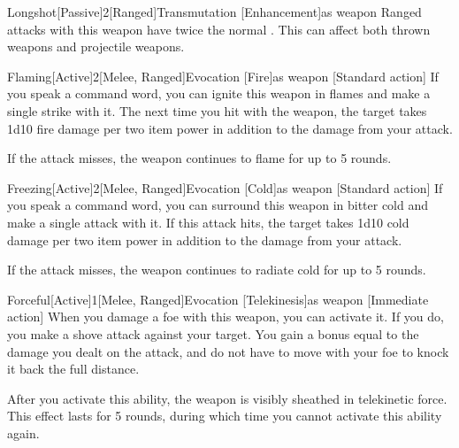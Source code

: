         \begin{magicitemdef}{Longshot}[Passive]{2}[Ranged]{Transmutation [Enhancement]}{as weapon}
             Ranged attacks with this weapon have twice the normal .
            This can affect both thrown weapons and projectile weapons.
        \end{magicitemdef}

        \begin{magicitemdef}{Flaming}[Active]{2}[Melee, Ranged]{Evocation [Fire]}{as weapon}
            [Standard action] If you speak a command word, you can ignite this weapon in flames and make a single strike with it. The next time you hit with the weapon, the target takes 1d10 fire damage per two item power in addition to the damage from your attack.

            If the attack misses, the weapon continues to flame for up to 5 rounds.
        \end{magicitemdef}

        \begin{magicitemdef}{Freezing}[Active]{2}[Melee, Ranged]{Evocation [Cold]}{as weapon}
            [Standard action] If you speak a command word, you can surround this weapon in bitter cold and make a single attack with it. If this attack hits, the target takes 1d10 cold damage per two item power in addition to the damage from your attack.

            If the attack misses, the weapon continues to radiate cold for up to 5 rounds.
        \end{magicitemdef}

        \begin{magicitemdef}{Forceful}[Active]{1}[Melee, Ranged]{Evocation [Telekinesis]}{as weapon}
            [Immediate action] When you damage a foe with this weapon, you can activate it.
            If you do, you make a shove attack against your target.
            You gain a bonus equal to the damage you dealt on the attack, and do not have to move with your foe to knock it back the full distance.

            After you activate this ability, the weapon is visibly sheathed in telekinetic force.
            This effect lasts for 5 rounds, during which time you cannot activate this ability again.
        \end{magicitemdef}

